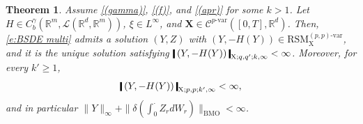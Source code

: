 \documentclass[11pt,reqno]{amsart}
\newtheorem{theorem}[lemma]{Theorem}
\numberwithin{equation}{section}
\def\R{\mathbb R}
\newcommand{\shortthickbar}{%
  \vcenter{\hbox{\rule{1.8pt}{2.2ex}}}%
}
\newcommand{\thicknm}[1]{%
  \mathopen{\shortthickbar}%
  \mkern4mu #1 \mkern4mu%
  \mathclose{\shortthickbar}%
}
\begin{document}
\begin{theorem}\label{thm:multi-d conditional}
Assume \ref{(gamma)}, \ref{(f)}, and \ref{(apr)} for some $k>1$. Let $H\in C^{\gamma}_{b}(\R^m,\mathscr L(\R^d,\R^m))$, $\xi\in L^{\infty}$, and $\mathbf X\in \mathscr{C}^{p\text{-}\mathrm{var}}([0,T], \R^{d})$. 
Then, \eqref{e:BSDE multi} admits a solution $(Y,Z)$ with $(Y,-H(Y))\in \mathrm{RSM}^{(p,p)\text{-}\mathrm{var}}_{\mathrm X}$, and it is the unique solution satisfying $\thicknm{(Y,-H(Y))}_{\mathrm X;q,q';k,\infty} < \infty$. 
Moreover, for every $k'\ge 1$,
\begin{equation}\label{e:multi-d bound}
\thicknm{(Y,-H(Y))}_{\mathrm X;p,p;k',\infty} < \infty,
\end{equation}
and in particular
$\|Y\|_{\infty} + \|\delta (\int_{0}^{\bm\cdot} Z_r dW_r)\|_{\mathrm{BMO}} < \infty$.
\end{theorem}
\end{document}
